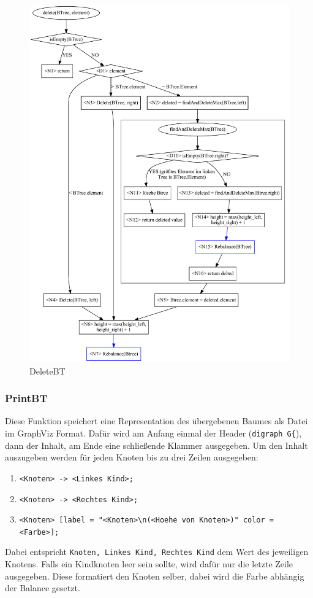 \begin{figure}[htbp]
    \centering
    \includegraphics[scale = 0.35]{img/gv/delete}
    \caption{DeleteBT}
    \label{fig:AVL-delete}
\end{figure}

\subsubsection{PrintBT}\label{par:printBT}
Diese Funktion speichert eine Representation des übergebenen Baumes als Datei im GraphViz Format.
Dafür wird am Anfang einmal der Header (\verb|digraph G{|), dann der Inhalt, am Ende eine
schließende Klammer ausgegeben.
Um den Inhalt auszugeben werden für jeden Knoten bis zu drei Zeilen ausgegeben:
\begin{enumerate}
    \item \verb|<Knoten> -> <Linkes Kind>;|
    \item \verb|<Knoten> -> <Rechtes Kind>;|
    \item \verb|<Knoten> [label = "<Knoten>\n(<Hoehe von Knoten>)" color = <Farbe>];|
\end{enumerate}
Dabei entspricht \verb|Knoten, Linkes Kind, Rechtes Kind| dem Wert des jeweiligen Knotens.
Falls ein Kindknoten leer sein sollte, wird dafür nur die letzte Zeile ausgegeben.
Diese formatiert den Knoten selber, dabei wird die Farbe abhängig der Balance gesetzt.

